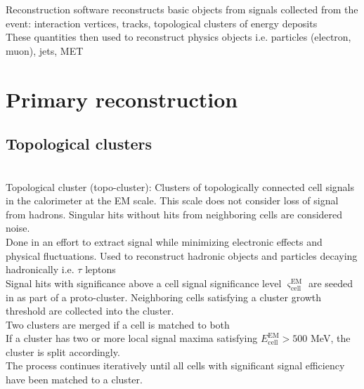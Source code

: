 \documentclass[../thesis.tex]{subfiles}
\begin{document}
\vspace{-1\baselineskip}

Reconstruction software reconstructs basic objects from signals collected from the event: interaction vertices, tracks, topological clusters of energy deposits\\
These quantities then used to reconstruct physics objects i.e. particles (electron, muon), jets, MET

\section{Primary reconstruction}
\label{sec:primaryreco}

\subsection{Topological clusters}
\label{sec:topocluster}
\citep{reco:topocluster}\citep{reco:topocluster_2}\\
Topological cluster (topo-cluster): Clusters of topologically connected cell signals in the calorimeter at the EM scale. This scale does not consider loss of signal from hadrons. Singular hits without hits from neighboring cells are considered noise.\\
Done in an effort to extract signal while minimizing electronic effects and physical fluctuations. 
Used to reconstruct hadronic objects and particles decaying hadronically i.e. $\tau$ leptons\\
Signal hits with significance above a cell signal significance level $\varsigma_\mathrm{cell}^\mathrm{EM}$ are seeded in as part of a proto-cluster. Neighboring cells satisfying a cluster growth threshold are collected into the cluster.\\
Two clusters are merged if a cell is matched to both\\
If a cluster has two or more local signal maxima satisfying $E_\mathrm{cell}^\mathrm{EM}>500$ MeV, the cluster is split accordingly.\\
The process continues iteratively until all cells with significant signal efficiency have been matched to a cluster.\\
\end{document}
